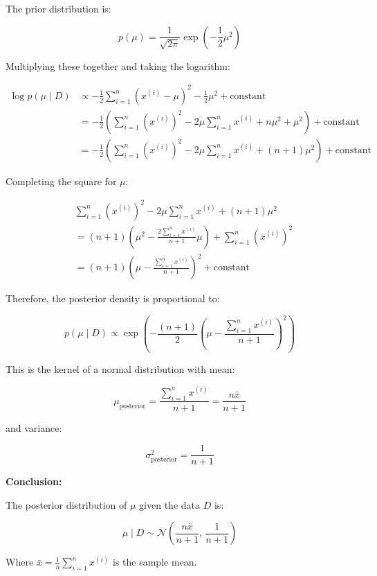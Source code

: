 \documentclass{article}
\begin{document}
The prior distribution is:

\[
p(\mu) = \frac{1}{\sqrt{2\pi}} \exp\left(-\frac{1}{2}\mu^2\right)
\]

Multiplying these together and taking the logarithm:

\begin{align*}
\log p(\mu \mid D) &\propto -\frac{1}{2}\sum_{i=1}^n (x^{(i)} - \mu)^2 - \frac{1}{2}\mu^2 + \text{constant} \\
&= -\frac{1}{2}\left(\sum_{i=1}^n (x^{(i)})^2 - 2\mu\sum_{i=1}^n x^{(i)} + n\mu^2 + \mu^2\right) + \text{constant} \\
&= -\frac{1}{2}\left(\sum_{i=1}^n (x^{(i)})^2 - 2\mu\sum_{i=1}^n x^{(i)} + (n+1)\mu^2\right) + \text{constant}
\end{align*}

Completing the square for $\mu$:

\begin{align*}
&\sum_{i=1}^n (x^{(i)})^2 - 2\mu\sum_{i=1}^n x^{(i)} + (n+1)\mu^2 \\
&= (n+1)\left(\mu^2 - \frac{2\sum_{i=1}^n x^{(i)}}{n+1}\mu\right) + \sum_{i=1}^n (x^{(i)})^2 \\
&= (n+1)\left(\mu - \frac{\sum_{i=1}^n x^{(i)}}{n+1}\right)^2 + \text{constant}
\end{align*}

Therefore, the posterior density is proportional to:

\[
p(\mu \mid D) \propto \exp\left( - \frac{(n + 1)}{2} \left( \mu - \frac{\sum_{i=1}^{n} x^{(i)}}{n + 1} \right)^2 \right)
\]

This is the kernel of a normal distribution with mean:

\[
\mu_{\text{posterior}} = \frac{\sum_{i=1}^{n} x^{(i)}}{n + 1} = \frac{n \bar{x}}{n + 1}
\]

and variance:

\[
\sigma_{\text{posterior}}^2 = \frac{1}{n + 1}
\]

\textbf{Conclusion:}

The posterior distribution of $\mu$ given the data $D$ is:

\[
\mu \mid D \sim \mathcal{N}\left( \frac{n \bar{x}}{n + 1}, \, \frac{1}{n + 1} \right)
\]

Where $\bar{x} = \frac{1}{n} \sum_{i=1}^{n} x^{(i)}$ is the sample mean.
\end{document}
